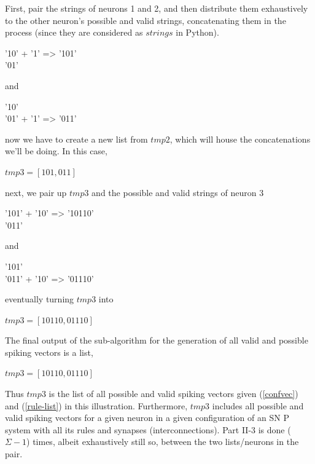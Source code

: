 \documentclass{acm_proc_article-sp}
\begin{document}
First, pair the strings of neurons 1 and 2, and then distribute them exhaustively to the other neuron's possible and valid strings, concatenating them in the process (since they are considered as $strings$ in Python). 

'10'  +	'1' => '101'\\
'01' 

and 

'10' \\
'01'  +	'1' => '011'

now we have to create a new list from $tmp2$, which will house the concatenations we'll be doing. In this case, 

		$tmp3 = [ 101, 011 ] $

next, we pair up $tmp3$ and the possible and valid strings of neuron 3 

'101' + '10' => '10110' \\
'011'
 
and 

'101' \\
'011' + '10' => '01110' 

eventually turning $tmp3$ into 

		$tmp3 = [ 10110, 01110 ]$ 

The final output of the sub-algorithm for the generation of all valid and possible spiking vectors is a list, 

		$tmp3 = [ 10110, 01110 ] $

Thus $tmp3$ is the list of all possible and valid spiking vectors given (\ref{confvec}) and (\ref{rule-list}) in this illustration. Furthermore, $tmp3$ includes all possible and valid spiking vectors for a given neuron in a given configuration of an SN P system with all its rules and 
synapses (interconnections). Part II-3 is done (	$\Sigma - 1$) times, albeit exhaustively still so, between the two lists/neurons in the pair. 
\end{document}
